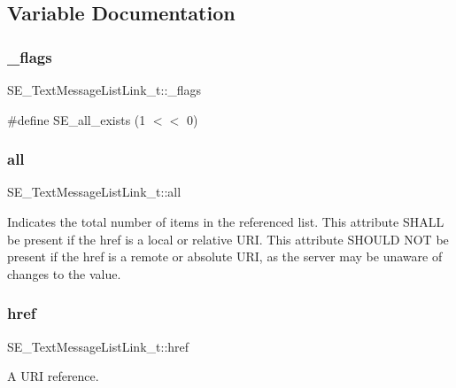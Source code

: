 \subsection{Variable Documentation}
\mbox{\label{group__TextMessageListLink_ga4c7b708274f34d0f2b39ba2e2c0c53f4}} 
\subsubsection{\texorpdfstring{\+\_\+flags}{\_flags}}
{\footnotesize\ttfamily S\+E\+\_\+\+Text\+Message\+List\+Link\+\_\+t\+::\+\_\+flags}

\#define S\+E\+\_\+all\+\_\+exists (1 $<$$<$ 0) \mbox{\label{group__TextMessageListLink_ga5e20ed8e4656cb69f86839b6c5297f98}} 
\subsubsection{\texorpdfstring{all}{all}}
{\footnotesize\ttfamily S\+E\+\_\+\+Text\+Message\+List\+Link\+\_\+t\+::all}

Indicates the total number of items in the referenced list. This attribute S\+H\+A\+LL be present if the href is a local or relative U\+RI. This attribute S\+H\+O\+U\+LD N\+OT be present if the href is a remote or absolute U\+RI, as the server may be unaware of changes to the value. \mbox{\label{group__TextMessageListLink_ga22a6b9bc1e90770e410f8c3e34bfa734}} 
\subsubsection{\texorpdfstring{href}{href}}
{\footnotesize\ttfamily S\+E\+\_\+\+Text\+Message\+List\+Link\+\_\+t\+::href}

A U\+RI reference. 
